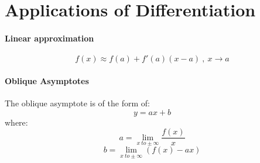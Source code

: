 \section{Applications of Differentiation}
\paragraph{Linear approximation}
	\begin{equation}
		f(x) \approx f(a) + f'(a)(x-a)\ ,\ x \to a
	\end{equation}
\paragraph{Oblique Asymptotes}
	The oblique asymptote is of the form of:
	\begin{equation}
		y = ax + b
	\end{equation}
	where:
	\begin{equation}
		a = \lim_{x \ to \pm \infty} \frac{f(x)}{x}
	\end{equation}
	\begin{equation}
		b = \lim_{x \ to \pm \infty} (f(x) - ax)
	\end{equation}
